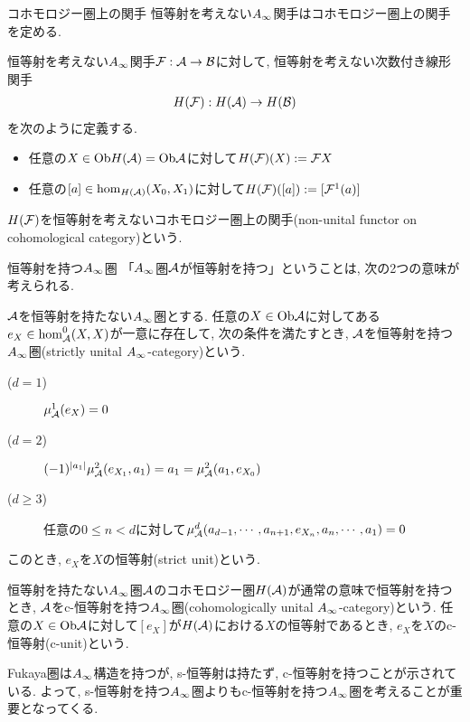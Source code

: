 \documentclass[aspectratio=169, dvipdfmx, 8pt, notheorems, uplatex]{beamer}
\begin{document}
\begin{frame}{コホモロジー圏上の関手}
  恒等射を考えない$A_\infty$関手はコホモロジー圏上の関手を定める. 

  \begin{definition}[恒等射を考えないコホモロジー圏上の関手] \label{prop_F_induces_HF}
    恒等射を考えない$A_\infty$関手$\mathcal{F} : \mathcal{A} \to \mathcal{B}$に対して, 恒等射を考えない次数付き線形関手
    \begin{align*}
      H(\mathcal{F}) : H(\mathcal{A}) \to H(\mathcal{B})
    \end{align*}
    を次のように定義する.
    \begin{itemize}
      \item 任意の$X \in \mathrm{Ob} H(\mathcal{A}) = \mathrm{Ob}\mathcal{A}$に対して$H(\mathcal{F})(X) := \mathcal{F} X$
      \item 任意の$[a] \in \hom_{H(\mathcal{A})}(X_0,X_1)$に対して$H(\mathcal{F})([a]) := [\mathcal{F}^1(a)]$
    \end{itemize}
    $H(\mathcal{F})$を恒等射を考えないコホモロジー圏上の関手(non-unital functor on cohomological category)という.
  \end{definition} 
\end{frame}

\begin{frame}{恒等射を持つ$A_\infty$圏}
  「$A_\infty$圏$\mathcal{A}$が恒等射を持つ」ということは, 次の2つの意味が考えられる. 

  \begin{definition}
    $\mathcal{A}$を恒等射を持たない$A_\infty$圏とする. 
    任意の$X \in \mathrm{Ob}\mathcal{A}$に対してある$e_X \in \hom_{\mathcal{A}}^0(X,X)$が一意に存在して, 次の条件を満たすとき, $\mathcal{A}$を恒等射を持つ$A_\infty$圏(strictly unital $A_\infty$-category)という. 
    \begin{description}
      \item[($d=1$)] $\mu^1_{\mathcal{A}}(e_X) = 0$ 
      \item[($d=2$)] $(-1)^{|a_1|} \mu^2_{\mathcal{A}}(e_{X_1},a_1) = a_1 = \mu^2_{\mathcal{A}}(a_1,e_{X_0})$
      \item[($d \geq 3$)] 任意の$0 \leq n < d$に対して$\mu^d_{\mathcal{A}}(a_{d-1},\cdots,a_{n+1},e_{X_n},a_n,\cdots,a_1) = 0$
    \end{description}
    このとき, $e_X$を$X$の恒等射(strict unit)という.
  \end{definition} 

  \begin{definition}
    恒等射を持たない$A_\infty$圏$\mathcal{A}$のコホモロジー圏$H(\mathcal{A})$が通常の意味で恒等射を持つとき, $\mathcal{A}$をc-恒等射を持つ$A_\infty$圏(cohomologically unital $A_\infty$-category)という. 
    任意の$X \in \mathrm{Ob}\mathcal{A}$に対して$[e_X]$が$H(\mathcal{A})$における$X$の恒等射であるとき, $e_X$を$X$のc-恒等射(c-unit)という.
  \end{definition} 

  Fukaya圏は$A_\infty$構造を持つが, s-恒等射は持たず, c-恒等射を持つことが示されている. 
  よって, s-恒等射を持つ$A_\infty$圏よりもc-恒等射を持つ$A_\infty$圏を考えることが重要となってくる. 
\end{frame}
\end{document}
